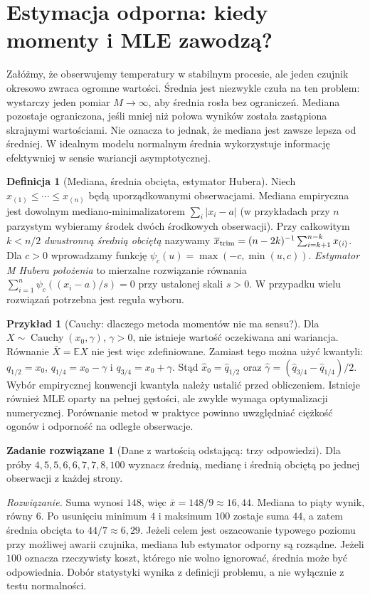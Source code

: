 \documentclass[11pt,a4paper,oneside]{report}
\numberwithin{equation}{chapter}
\theoremstyle{plain}
\theoremstyle{definition}
\newtheorem{definicja}{Definicja}[chapter]
\newtheorem{przyklad}{Przykład}[chapter]
\newtheorem{zadanie}{Zadanie rozwiązane}[chapter]
\theoremstyle{remark}
\newcommand{\E}{\mathbb E}
\begin{document}
\section{Estymacja odporna: kiedy momenty i MLE zawodzą?}
Załóżmy, że obserwujemy temperatury w stabilnym procesie, ale
jeden czujnik okresowo zwraca ogromne wartości. Średnia jest
niezwykle czuła na ten problem: wystarczy jeden pomiar $M\to\infty$,
aby średnia rosła bez ograniczeń. Mediana pozostaje ograniczona,
jeśli mniej niż połowa wyników została zastąpiona skrajnymi wartościami.
Nie oznacza to jednak, że mediana jest zawsze lepsza od średniej.
W idealnym modelu normalnym średnia wykorzystuje informację
efektywniej w sensie wariancji asymptotycznej.

\begin{definicja}[Mediana, średnia obcięta, estymator Hubera]
Niech $x_{(1)}\le\cdots\le x_{(n)}$ będą uporządkowanymi obserwacjami.
Mediana empiryczna jest dowolnym mediano-minimalizatorem
$\sum_i|x_i-a|$ (w przykładach przy $n$ parzystym wybieramy
środek dwóch środkowych obserwacji). Przy całkowitym $k<n/2$
\emph{dwustronną średnią obciętą} nazywamy
$\overline x_{\rm trim}=(n-2k)^{-1}\sum_{i=k+1}^{n-k}x_{(i)}$.
Dla $c>0$ wprowadzamy funkcję
$\psi_c(u)=\max(-c,\min(u,c))$. \emph{Estymator M Hubera położenia}
to mierzalne rozwiązanie równania
$\sum_{i=1}^n\psi_c((x_i-a)/s)=0$ przy ustalonej skali $s>0$.
W przypadku wielu rozwiązań potrzebna jest reguła wyboru.
\end{definicja}

\begin{przyklad}[Cauchy: dlaczego metoda momentów nie ma sensu?]
Dla $X\sim\operatorname{Cauchy}(x_0,\gamma)$, $\gamma>0$,
nie istnieje wartość oczekiwana ani wariancja. Równanie
$\bar X=\E X$ nie jest więc zdefiniowane. Zamiast tego można
użyć kwantyli: $q_{1/2}=x_0$,
$q_{1/4}=x_0-\gamma$ i $q_{3/4}=x_0+\gamma$. Stąd
$\widehat x_0=\widehat q_{1/2}$ oraz
$\widehat\gamma=(\widehat q_{3/4}-\widehat q_{1/4})/2$.
Wybór empirycznej konwencji kwantyla należy ustalić przed
obliczeniem. Istnieje również MLE oparty na pełnej gęstości,
ale zwykle wymaga optymalizacji numerycznej. Porównanie metod
w praktyce powinno uwzględniać ciężkość ogonów i odporność
na odległe obserwacje.
\end{przyklad}

\begin{zadanie}[Dane z wartością odstającą: trzy odpowiedzi]
Dla próby $4,5,5,6,6,7,7,8,100$ wyznacz średnią, medianę
i średnią obciętą po jednej obserwacji z każdej strony.
\par\emph{Rozwiązanie.} Suma wynosi $148$, więc
$\bar x=148/9\approx16{,}44$. Mediana to piąty wynik, równy $6$.
Po usunięciu minimum $4$ i maksimum $100$ zostaje suma $44$,
a zatem średnia obcięta to $44/7\approx6{,}29$.
Jeżeli celem jest oszacowanie typowego poziomu przy możliwej
awarii czujnika, mediana lub estymator odporny są rozsądne.
Jeżeli $100$ oznacza rzeczywisty koszt, którego nie wolno ignorować,
średnia może być odpowiednia. Dobór statystyki wynika z definicji
problemu, a nie wyłącznie z testu normalności.
\end{zadanie}
\end{document}
